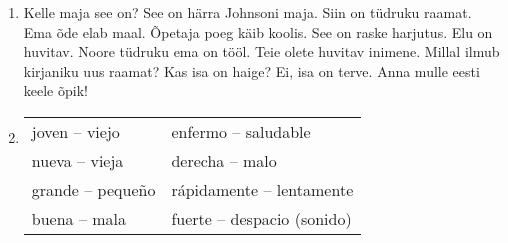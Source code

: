 \begin{enumerate}
	\item Kelle maja see on? See on härra Johnsoni maja. Siin on tüdruku raamat. Ema õde elab maal. Õpetaja poeg käib koolis. See on raske harjutus. Elu on huvitav. Noore tüdruku ema on tööl. Teie olete huvitav inimene. Millal ilmub kirjaniku uus raamat? Kas isa on haige? Ei, isa on terve. Anna mulle eesti keele õpik!

	\item 
	\begin{tabular}{ l l }
	 joven -- viejo 	& enfermo -- saludable \\
	 nueva -- vieja 	& derecha -- malo \\
	 grande -- pequeño	& rápidamente -- lentamente \\
	 buena -- mala 		& fuerte -- despacio (sonido) 
	\end{tabular}
\end{enumerate}

